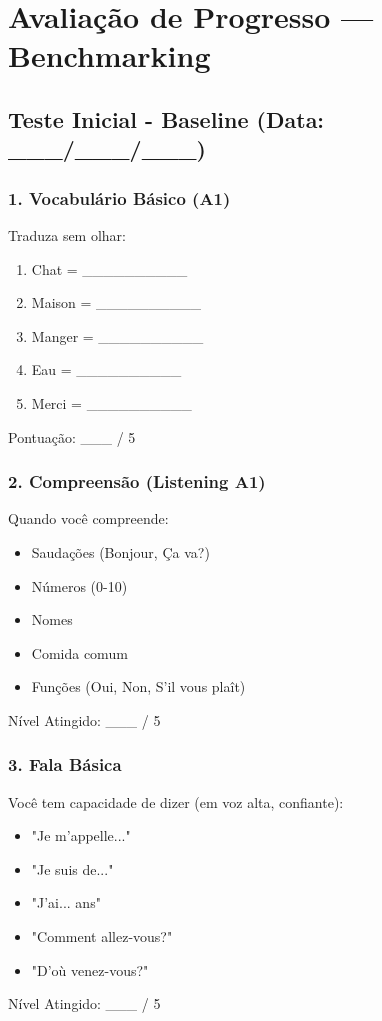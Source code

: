 \documentclass[a4paper,12pt]{article}
\begin{document}
\section{Avaliação de Progresso — Benchmarking}
\subsection{Teste Inicial - Baseline (Data: \_\_\_/\_\_\_/\_\_\_)}
\subsubsection{1. Vocabulário Básico (A1)}
Traduza sem olhar:
\begin{enumerate}
    \item Chat = \_\_\_\_\_\_\_\_\_\_
    \item Maison = \_\_\_\_\_\_\_\_\_\_
    \item Manger = \_\_\_\_\_\_\_\_\_\_
    \item Eau = \_\_\_\_\_\_\_\_\_\_
    \item Merci = \_\_\_\_\_\_\_\_\_\_
\end{enumerate}
Pontuação: \_\_\_ / 5

\subsubsection{2. Compreensão (Listening A1)}
Quando você compreende:
\begin{itemize}
    \item Saudações (Bonjour, Ça va?)
    \item Números (0-10)
    \item Nomes
    \item Comida comum
    \item Funções (Oui, Non, S’il vous plaît)
\end{itemize}
Nível Atingido: \_\_\_ / 5

\subsubsection{3. Fala Básica}
Você tem capacidade de dizer (em voz alta, confiante):
\begin{itemize}
    \item "Je m’appelle..."
    \item "Je suis de..."
    \item "J’ai... ans"
    \item "Comment allez-vous?"
    \item "D’où venez-vous?"
\end{itemize}
Nível Atingido: \_\_\_ / 5
\end{document}
